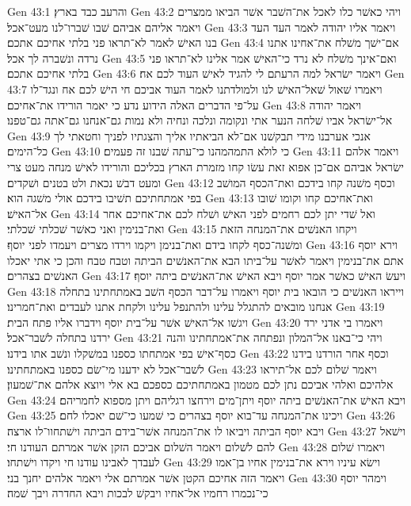 Gen 43:1  והרעב כבד בארץ׃
Gen 43:2  ויהי כאשׁר כלו לאכל את־השׁבר אשׁר הביאו ממצרים ויאמר אליהם אביהם שׁבו שׁברו־לנו מעט־אכל׃
Gen 43:3  ויאמר אליו יהודה לאמר העד העד בנו האישׁ לאמר לא־תראו פני בלתי אחיכם אתכם׃
Gen 43:4  אם־ישׁך משׁלח את־אחינו אתנו נרדה ונשׁברה לך אכל׃
Gen 43:5  ואם־אינך משׁלח לא נרד כי־האישׁ אמר אלינו לא־תראו פני בלתי אחיכם אתכם׃
Gen 43:6  ויאמר ישׂראל למה הרעתם לי להגיד לאישׁ העוד לכם אח׃
Gen 43:7  ויאמרו שׁאול שׁאל־האישׁ לנו ולמולדתנו לאמר העוד אביכם חי הישׁ לכם אח ונגד־לו על־פי הדברים האלה הידוע נדע כי יאמר הורידו את־אחיכם׃
Gen 43:8  ויאמר יהודה אל־ישׂראל אביו שׁלחה הנער אתי ונקומה ונלכה ונחיה ולא נמות גם־אנחנו גם־אתה גם־טפנו׃
Gen 43:9  אנכי אערבנו מידי תבקשׁנו אם־לא הביאתיו אליך והצגתיו לפניך וחטאתי לך כל־הימים׃
Gen 43:10  כי לולא התמהמהנו כי־עתה שׁבנו זה פעמים׃
Gen 43:11  ויאמר אלהם ישׂראל אביהם אם־כן אפוא זאת עשׂו קחו מזמרת הארץ בכליכם והורידו לאישׁ מנחה מעט צרי ומעט דבשׁ נכאת ולט בטנים ושׁקדים׃
Gen 43:12  וכסף משׁנה קחו בידכם ואת־הכסף המושׁב בפי אמתחתיכם תשׁיבו בידכם אולי משׁגה הוא׃
Gen 43:13  ואת־אחיכם קחו וקומו שׁובו אל־האישׁ׃
Gen 43:14  ואל שׁדי יתן לכם רחמים לפני האישׁ ושׁלח לכם את־אחיכם אחר ואת־בנימין ואני כאשׁר שׁכלתי שׁכלתי׃
Gen 43:15  ויקחו האנשׁים את־המנחה הזאת ומשׁנה־כסף לקחו בידם ואת־בנימן ויקמו וירדו מצרים ויעמדו לפני יוסף׃
Gen 43:16  וירא יוסף אתם את־בנימין ויאמר לאשׁר על־ביתו הבא את־האנשׁים הביתה וטבח טבח והכן כי אתי יאכלו האנשׁים בצהרים׃
Gen 43:17  ויעשׂ האישׁ כאשׁר אמר יוסף ויבא האישׁ את־האנשׁים ביתה יוסף׃
Gen 43:18  וייראו האנשׁים כי הובאו בית יוסף ויאמרו על־דבר הכסף השׁב באמתחתינו בתחלה אנחנו מובאים להתגלל עלינו ולהתנפל עלינו ולקחת אתנו לעבדים ואת־חמרינו׃
Gen 43:19  ויגשׁו אל־האישׁ אשׁר על־בית יוסף וידברו אליו פתח הבית׃
Gen 43:20  ויאמרו בי אדני ירד ירדנו בתחלה לשׁבר־אכל׃
Gen 43:21  ויהי כי־באנו אל־המלון ונפתחה את־אמתחתינו והנה כסף־אישׁ בפי אמתחתו כספנו במשׁקלו ונשׁב אתו בידנו׃
Gen 43:22  וכסף אחר הורדנו בידנו לשׁבר־אכל לא ידענו מי־שׂם כספנו באמתחתינו׃
Gen 43:23  ויאמר שׁלום לכם אל־תיראו אלהיכם ואלהי אביכם נתן לכם מטמון באמתחתיכם כספכם בא אלי ויוצא אלהם את־שׁמעון׃
Gen 43:24  ויבא האישׁ את־האנשׁים ביתה יוסף ויתן־מים וירחצו רגליהם ויתן מספוא לחמריהם׃
Gen 43:25  ויכינו את־המנחה עד־בוא יוסף בצהרים כי שׁמעו כי־שׁם יאכלו לחם׃
Gen 43:26  ויבא יוסף הביתה ויביאו לו את־המנחה אשׁר־בידם הביתה וישׁתחוו־לו ארצה׃
Gen 43:27  וישׁאל להם לשׁלום ויאמר השׁלום אביכם הזקן אשׁר אמרתם העודנו חי׃
Gen 43:28  ויאמרו שׁלום לעבדך לאבינו עודנו חי ויקדו וישׁתחו׃
Gen 43:29  וישׂא עיניו וירא את־בנימין אחיו בן־אמו ויאמר הזה אחיכם הקטן אשׁר אמרתם אלי ויאמר אלהים יחנך בני׃
Gen 43:30  וימהר יוסף כי־נכמרו רחמיו אל־אחיו ויבקשׁ לבכות ויבא החדרה ויבך שׁמה׃
